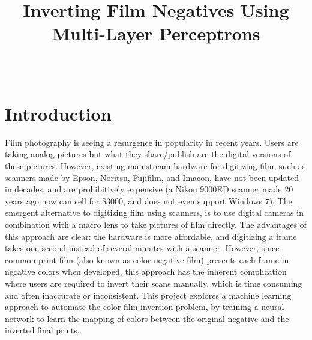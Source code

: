 \documentclass[twoside,11pt]{article}
\begin{document}
\title{Inverting Film Negatives Using Multi-Layer Perceptrons
}

\author{
		 \\
	}


\maketitle

\section{Introduction}
\label{sec:intro}
Film photography is seeing a resurgence in popularity in recent years. Users are taking analog pictures 
but what they share/publish are the digital versions of these pictures. However, existing mainstream hardware for digitizing 
film, such as scanners made by Epson, Noritsu, Fujifilm, and Imacon, have not been updated in decades, and are prohibitively expensive 
(a Nikon 9000ED scanner made 20 years ago now can sell for \$3000, and does not even support Windows 7).
The emergent alternative to digitizing film using scanners, is to use digital cameras in combination with a macro lens to take pictures 
of film directly. The advantages of this approach are clear: the hardware is more affordable, and digitizing a frame takes one second instead of 
several minutes with a scanner. However, since common print film (also known as color negative film) presents each frame in negative colors when developed, 
this approach has the inherent complication where users are required to invert their scans manually, which is time consuming and often inaccurate or inconsistent.
This project explores a machine learning approach to automate the color film inversion problem, by training a neural network to learn the mapping of colors between 
the original negative and the inverted final prints.

\end{document}
